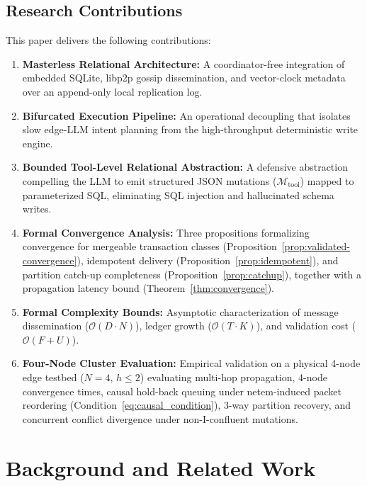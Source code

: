 \subsection{Research Contributions}
This paper delivers the following contributions:
\begin{enumerate}
    \item \textbf{Masterless Relational Architecture:} A coordinator-free integration of embedded SQLite, libp2p gossip dissemination, and vector-clock metadata over an append-only local replication log.
    \item \textbf{Bifurcated Execution Pipeline:} An operational decoupling that isolates slow edge-LLM intent planning from the high-throughput deterministic write engine.
    \item \textbf{Bounded Tool-Level Relational Abstraction:} A defensive abstraction compelling the LLM to emit structured JSON mutations ($\mathcal{M}_{\text{tool}}$) mapped to parameterized SQL, eliminating SQL injection and hallucinated schema writes.
    \item \textbf{Formal Convergence Analysis:} Three propositions formalizing convergence for mergeable transaction classes (Proposition~\ref{prop:validated-convergence}), idempotent delivery (Proposition~\ref{prop:idempotent}), and partition catch-up completeness (Proposition~\ref{prop:catchup}), together with a propagation latency bound (Theorem~\ref{thm:convergence}).
    \item \textbf{Formal Complexity Bounds:} Asymptotic characterization of message dissemination ($\mathcal{O}(D \cdot N)$), ledger growth ($\mathcal{O}(T \cdot K)$), and validation cost ($\mathcal{O}(F + U)$).
    \item \textbf{Four-Node Cluster Evaluation:} Empirical validation on a physical 4-node edge testbed ($N=4$, $h \le 2$) evaluating multi-hop propagation, 4-node convergence times, causal hold-back queuing under netem-induced packet reordering (Condition~\eqref{eq:causal_condition}), 3-way partition recovery, and concurrent conflict divergence under non-I-confluent mutations.
\end{enumerate}

\section{Background and Related Work}
\label{sec:related_work}

